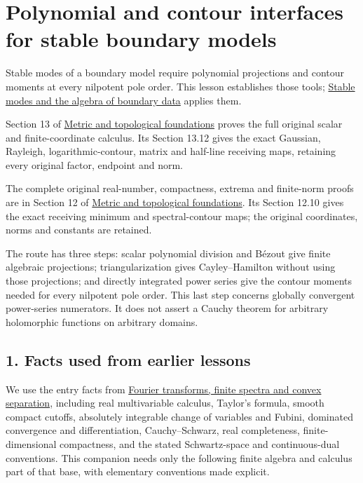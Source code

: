 \documentclass[
  11pt,
]{article}
\author{}
\date{}
\begin{document}
\section{Polynomial and contour interfaces for stable boundary
models}\label{polynomial-and-contour-interfaces-for-stable-boundary-models}

Stable modes of a boundary model require polynomial projections and
contour moments at every nilpotent pole order. This lesson establishes
those tools; \href{stable-boundary-models.pdf}{Stable modes and the
algebra of boundary data} applies them.

Section 13 of
\href{metric-foundation-bridges.md\#original-scalar-calculus-and-its-finite-coordinate-receivers}{Metric
and topological foundations} proves the full original scalar and
finite-coordinate calculus. Its Section 13.12 gives the exact Gaussian,
Rayleigh, logarithmic-contour, matrix and half-line receiving maps,
retaining every original factor, endpoint and norm.

The complete original real-number, compactness, extrema and finite-norm
proofs are in Section 12 of
\href{metric-foundation-bridges.md\#real-numbers-and-finite-dimensional-topology}{Metric
and topological foundations}. Its Section 12.10 gives the exact
receiving minimum and spectral-contour maps; the original coordinates,
norms and constants are retained.

The route has three steps: scalar polynomial division and Bézout give
finite algebraic projections; triangularization gives Cayley--Hamilton
without using those projections; and directly integrated power series
give the contour moments needed for every nilpotent pole order. This
last step concerns globally convergent power-series numerators. It does
not assert a Cauchy theorem for arbitrary holomorphic functions on
arbitrary domains.

\subsection{1. Facts used from earlier
lessons}\label{facts-used-from-earlier-lessons}

We use the entry facts from \href{prerequisite-bridges.pdf}{Fourier
transforms, finite spectra and convex separation}, including real
multivariable calculus, Taylor's formula, smooth compact cutoffs,
absolutely integrable change of variables and Fubini, dominated
convergence and differentiation, Cauchy--Schwarz, real completeness,
finite-dimensional compactness, and the stated Schwartz-space and
continuous-dual conventions. This companion needs only the following
finite algebra and calculus part of that base, with elementary
conventions made explicit.
\end{document}
